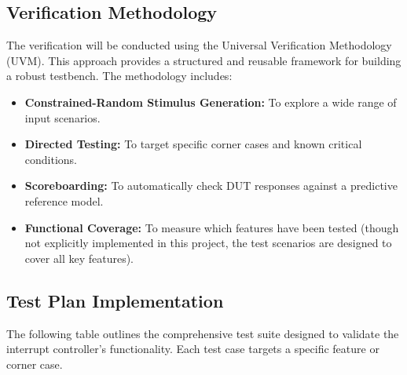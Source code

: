 \documentclass[12pt,a4paper]{article}
\begin{document}
\subsection{Verification Methodology}
The verification will be conducted using the Universal Verification Methodology (UVM). This approach provides a structured and reusable framework for building a robust testbench. The methodology includes:
\begin{itemize}
    \item \textbf{Constrained-Random Stimulus Generation:} To explore a wide range of input scenarios.
    \item \textbf{Directed Testing:} To target specific corner cases and known critical conditions.
    \item \textbf{Scoreboarding:} To automatically check DUT responses against a predictive reference model.
    \item \textbf{Functional Coverage:} To measure which features have been tested (though not explicitly implemented in this project, the test scenarios are designed to cover all key features).
\end{itemize}

\subsection{Test Plan Implementation}
The following table outlines the comprehensive test suite designed to validate the interrupt controller's functionality. Each test case targets a specific feature or corner case.
\end{document}

